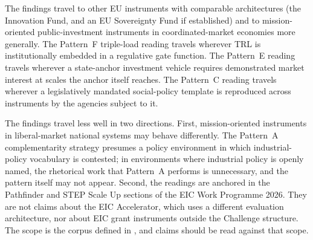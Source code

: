The findings travel to other EU instruments with comparable
architectures (the Innovation Fund, and an EU Sovereignty Fund if
established) and to mission-oriented public-investment instruments in
coordinated-market economies more generally. The Pattern~F triple-load
reading travels wherever TRL is institutionally embedded in a
regulative gate function. The Pattern~E reading travels wherever a
state-anchor investment vehicle requires demonstrated market interest
at scales the anchor itself reaches. The Pattern~C reading travels
wherever a legislatively mandated social-policy template is reproduced
across instruments by the agencies subject to it.

The findings travel less well in two directions. First,
mission-oriented instruments in liberal-market national systems may
behave differently. The Pattern~A complementarity strategy presumes a
policy environment in which industrial-policy vocabulary is contested;
in environments where industrial policy is openly named, the
rhetorical work that Pattern~A performs is unnecessary, and the
pattern itself may not appear. Second, the readings are anchored in
the Pathfinder and STEP Scale Up sections of the EIC Work Programme
2026. They are not claims about the EIC Accelerator, which uses a
different evaluation architecture, nor about EIC grant instruments
outside the Challenge structure. The scope is the corpus defined in
, and claims should be read against that scope.
